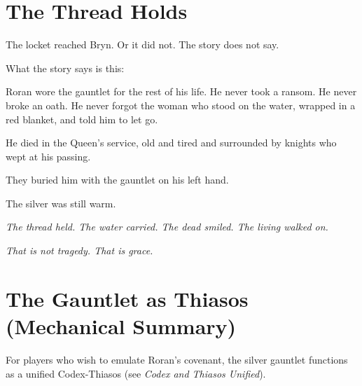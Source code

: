 \section*{The Thread Holds}

The locket reached Bryn. Or it did not. The story does not say.

What the story says is this:

Roran wore the gauntlet for the rest of his life. He never took a ransom. He never broke an oath. He never forgot the woman who stood on the water, wrapped in a red blanket, and told him to let go.

He died in the Queen's service, old and tired and surrounded by knights who wept at his passing.

They buried him with the gauntlet on his left hand.

The silver was still warm.

\vspace{1em}

\begin{center}
\textit{The thread held. The water carried. The dead smiled. The living walked on.}
\end{center}

\vspace{1em}

\begin{center}
\textit{That is not tragedy. That is grace.}
\end{center}

\section*{The Gauntlet as Thiasos (Mechanical Summary)}

For players who wish to emulate Roran's covenant, the silver gauntlet functions as a unified Codex-Thiasos (see \textit{Codex and Thiasos Unified}).

